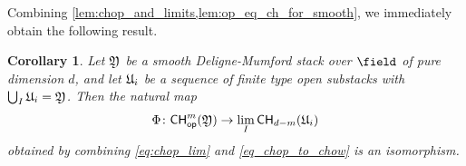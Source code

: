 \documentclass[a4paper,12pt]{article} %
\theoremstyle{definition}
\theoremstyle{plain}%
\newtheorem{corollary}[definition]{Corollary}
\newcommand{\aj}{{\scriptstyle \mathsf{AJ}}}
\newcommand{\Chow}{\mathsf{CH}}
\newcommand{\CHop}{\Chow_{\mathsf{op}}}
\newcommand{\DRop}{\mathsf{DR}^{\mathsf{op}}}
\begin{document}
Combining \cref{lem:chop_and_limits,lem:op_eq_ch_for_smooth}, we immediately obtain the following
result.
\begin{corollary}
Let $\frak Y$ be a smooth Deligne-Mumford stack over ${\field}$ of pure dimension $d$, and let $\frak U_i$ be a sequence of finite type open substacks with $\bigcup_I \frak U_i = \frak Y$. Then the natural map 
\begin{equation}
\Phi\colon \CHop^m(\frak Y) \to \lim_I \Chow_{d-m}(\frak U_i)
\end{equation}
obtained by combining \eqref{eq:chop_lim} and \eqref{eq_chop_to_chow} is an isomorphism. 
\end{corollary}
\end{document}
